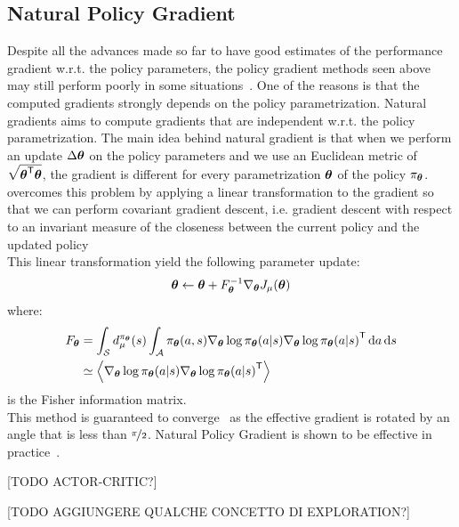 \subsection{Natural Policy Gradient}
Despite all the advances made so far to have good estimates of the performance gradient w.r.t. the policy parameters, the policy gradient methods seen above may still perform poorly in some situations~\cite{peters}. One of the reasons is that the computed gradients strongly depends on the policy parametrization. Natural gradients aims to compute gradients that are independent w.r.t. the policy parametrization. The main idea behind natural gradient is that when we perform an update $\Delta{\boldsymbol{\theta}}$ on the policy parameters and we use an Euclidean metric of $\sqrt{{{\boldsymbol{\theta}}}^{\mathsf{T}}{\boldsymbol{\theta}}}$, the gradient is different for every parametrization ${\boldsymbol{\theta}}$ of the policy $\pi_{{\boldsymbol{\theta}}}$. \cite{natural} overcomes this problem by applying a linear transformation to the gradient so that we can perform covariant gradient descent, i.e. gradient descent with respect to an invariant measure of the closeness between the current policy and the updated policy~\cite{peters}\\
This linear transformation yield the following parameter update:
\[
{\boldsymbol{\theta}} \gets {\boldsymbol{\theta}} + F_{{\boldsymbol{\theta}}}^{-1}\nabla_{{\boldsymbol{\theta}}}J_\mu({\boldsymbol{\theta}})
\]
where:
\begin{align*}
F_{{\boldsymbol{\theta}}} &= \int_{\mathcal{S}}d_\mu^{\pi_{{\boldsymbol{\theta}}}}(s)\int_{\mathcal{A}}\pi_{{\boldsymbol{\theta}}}(a,s)\nabla_{{\boldsymbol{\theta}}}\log\pi_{{\boldsymbol{\theta}}}(a|s){\nabla_{{\boldsymbol{\theta}}}\log\pi_{{\boldsymbol{\theta}}}(a|s)}^{\mathsf{T}}\, \textrm{d} a \, \textrm{d} s
\\&\simeq \left\langle \nabla_{{\boldsymbol{\theta}}}\log\pi_{{\boldsymbol{\theta}}}(a|s){\nabla_{{\boldsymbol{\theta}}}\log\pi_{{\boldsymbol{\theta}}}(a|s)}^{\mathsf{T}} \right\rangle
\end{align*}
is the Fisher information matrix.\\
This method is guaranteed to converge~\cite{Amari:1998:NGW:287476.287477} as the effective gradient is rotated by an angle that is less than $\nicefrac{\pi}{2}$. Natural Policy Gradient is shown to be effective in practice~\cite{PETERS20081180}.

[TODO ACTOR-CRITIC?]

[TODO AGGIUNGERE QUALCHE CONCETTO DI EXPLORATION?]